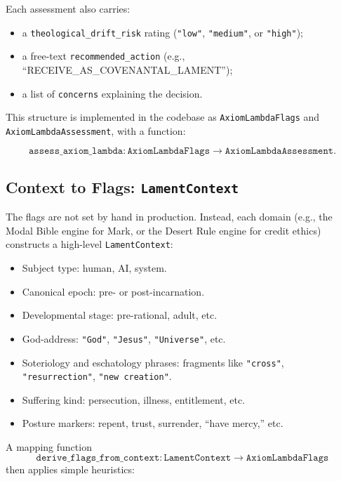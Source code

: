 \documentclass[11pt]{article}
\begin{document}
Each assessment also carries:
\begin{itemize}
  \item a \texttt{theological\_drift\_risk} rating (\texttt{"low"}, \texttt{"medium"}, or \texttt{"high"});
  \item a free-text \texttt{recommended\_action} (e.g., ``RECEIVE\_AS\_COVENANTAL\_LAMENT'');
  \item a list of \texttt{concerns} explaining the decision.
\end{itemize}

This structure is implemented in the codebase as \texttt{AxiomLambdaFlags} and \texttt{AxiomLambdaAssessment}, with a function:

\[
  \texttt{assess\_axiom\_lambda} : \texttt{AxiomLambdaFlags} \rightarrow \texttt{AxiomLambdaAssessment}.
\]

\subsection{Context to Flags: \texttt{LamentContext}}

The flags are not set by hand in production. Instead, each domain (e.g., the Modal Bible engine for Mark, or the Desert Rule engine for credit ethics) constructs a high-level \texttt{LamentContext}:

\begin{itemize}
  \item Subject type: human, AI, system.
  \item Canonical epoch: pre- or post-incarnation.
  \item Developmental stage: pre-rational, adult, etc.
  \item God-address: \texttt{"God"}, \texttt{"Jesus"}, \texttt{"Universe"}, etc.
  \item Soteriology and eschatology phrases: fragments like \texttt{"cross"}, \texttt{"resurrection"}, \texttt{"new creation"}.
  \item Suffering kind: persecution, illness, entitlement, etc.
  \item Posture markers: repent, trust, surrender, ``have mercy,'' etc.
\end{itemize}

A mapping function
\[
  \texttt{derive\_flags\_from\_context} : \texttt{LamentContext} \rightarrow \texttt{AxiomLambdaFlags}
\]
then applies simple heuristics:
\end{document}
